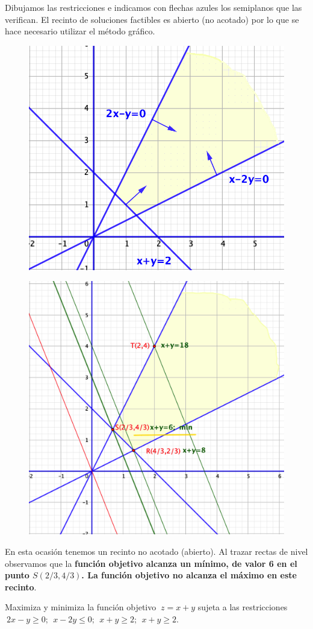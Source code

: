 \vspace{5mm}
Dibujamos las restricciones e indicamos con flechas azules los semiplanos que las verifican. El recinto de soluciones factibles es abierto (no acotado) por lo que se hace necesario utilizar el método gráfico.

\vspace{10mm}
\begin{multicols}{2}
\begin{figure}[H]
	\centering
	\includegraphics[width=.5\textwidth]{imagenes/img21.png}
\end{figure}
\begin{figure}[H]
	\centering
	\includegraphics[width=.45\textwidth]{imagenes/img22.png}
\end{figure}	
\end{multicols}
\vspace{5mm}

\begin{destacado}
En esta ocasión tenemos un recinto no acotado (abierto). Al trazar rectas de nivel observamos que la \textbf{función objetivo alcanza un mínimo, de valor 6 en el  punto $S(2/3,4/3)$. La función objetivo no alcanza el máximo en este recinto}.
\end{destacado}


\begin{ejemplo}
\begin{ejre}
Maximiza y minimiza la función objetivo $\ z=x+y$ sujeta a las restricciones 	$\  2x-y\ge 0;\ \ x-2y\le 0;\ \ x+y\ge 2; \ \ x+y\ge 2$.
\end{ejre}
\end{ejemplo}


